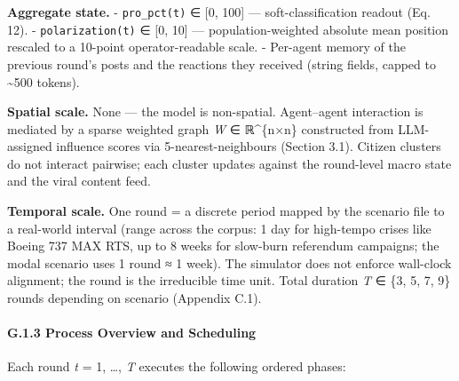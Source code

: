 \documentclass[
]{article}
\begin{document}
\textbf{Aggregate state.} - \texttt{pro\_pct(t)} ∈ {[}0, 100{]} ---
soft-classification readout (Eq. 12). - \texttt{polarization(t)} ∈ {[}0,
10{]} --- population-weighted absolute mean position rescaled to a
10-point operator-readable scale. - Per-agent memory of the previous
round's posts and the reactions they received (string fields, capped to
\textasciitilde500 tokens).

\textbf{Spatial scale.} None --- the model is non-spatial. Agent--agent
interaction is mediated by a sparse weighted graph \emph{W} ∈
ℝ\^{}\{n×n\} constructed from LLM-assigned influence scores via
5-nearest-neighbours (Section 3.1). Citizen clusters do not interact
pairwise; each cluster updates against the round-level macro state and
the viral content feed.

\textbf{Temporal scale.} One round = a discrete period mapped by the
scenario file to a real-world interval (range across the corpus: 1 day
for high-tempo crises like Boeing 737 MAX RTS, up to 8 weeks for
slow-burn referendum campaigns; the modal scenario uses 1 round ≈ 1
week). The simulator does not enforce wall-clock alignment; the round is
the irreducible time unit. Total duration \emph{T} ∈ \{3, 5, 7, 9\}
rounds depending on scenario (Appendix C.1).

\paragraph{G.1.3 Process Overview and
Scheduling}\label{g.1.3-process-overview-and-scheduling}

Each round \emph{t} = 1, \ldots, \emph{T} executes the following ordered
phases:
\end{document}
